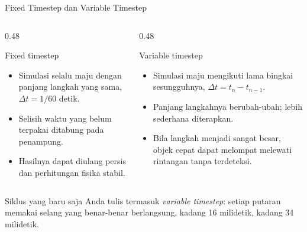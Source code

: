 \documentclass[aspectratio=169,10pt]{beamer}
\begin{document}
\begin{frame}{Fixed Timestep dan Variable Timestep}
\begin{columns}[T,onlytextwidth]
  \begin{column}{0.48\textwidth}
    \begin{block}{Fixed timestep}
      \begin{itemize}
        \item Simulasi selalu maju dengan panjang langkah yang sama,
              $\Delta t = 1/60$ detik.
        \item Selisih waktu yang belum terpakai ditabung pada penampung.
        \item Hasilnya dapat diulang persis dan perhitungan fisika stabil.
      \end{itemize}
    \end{block}
  \end{column}
  \begin{column}{0.48\textwidth}
    \begin{block}{Variable timestep}
      \begin{itemize}
        \item Simulasi maju mengikuti lama bingkai sesungguhnya,
              $\Delta t = t_n - t_{n-1}$.
        \item Panjang langkahnya berubah-ubah; lebih sederhana diterapkan.
        \item Bila langkah menjadi sangat besar, objek cepat dapat melompat
              melewati rintangan tanpa terdeteksi.
      \end{itemize}
    \end{block}
  \end{column}
\end{columns}
\vspace{0.22cm}
\begin{kotak}
Siklus yang baru saja Anda tulis termasuk \emph{variable timestep}: setiap
putaran memakai selang yang benar-benar berlangsung, kadang 16 milidetik,
kadang 34 milidetik.
\end{kotak}
\end{frame}
\end{document}
